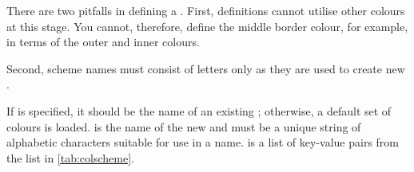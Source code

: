 \documentclass[10pt,british,a4paper]{ltxdoc}
\newcommand*\pkg[1]{\textpkg{#1}}
\begin{document}
There are two pitfalls in defining a \colschemelabelname{}.
First, definitions cannot utilise other \pkg{chronos} colours at this stage.
You cannot, therefore, define the middle border colour, for example, in terms of the outer and inner colours.

Second, scheme names must consist of letters only as they are used to create new \macroslabelname{}.

\DescribeMacro{\chronosnewcolourscheme}\AfterLastParam
\DescribeMacro{\chronosnewcolorscheme}\AfterLastParam
If  is specified, it should be the name of an existing \colschemelabelname{}; otherwise, a default set of colours is loaded. 
 is the name of the new \colschemelabelname{} and must be a unique string of alphabetic characters suitable for use in a \macrolabelname{} name.
 is a list of key-value pairs from the list in \cref{tab:colscheme}.
\end{document}
